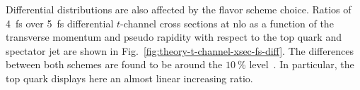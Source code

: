 
Differential distributions are also affected by the flavor scheme choice. Ratios of 4~\gls{fs} over 5~\gls{fs} differential $t$-channel cross sections at \gls{nlo} as a function of the transverse momentum and pseudo rapidity with respect to the top quark and spectator jet are shown in Fig.~\ref{fig:theory-t-channel-xsec-fs-diff}. The differences between both schemes are found to be around the $10~\%$ level~\cite{Campbell:2009ss}. In particular, the top quark \pt displays here an almost linear increasing ratio.

